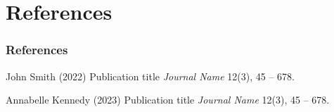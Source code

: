 \documentclass[
	11pt, %
]{beamer}
\begin{document}



\section{References}


\begin{frame} %
	\frametitle{References}
	
	\begin{thebibliography}{99} %
		\footnotesize %
		
			John Smith (2022)
			\newblock Publication title
			\newblock \emph{Journal Name} 12(3), 45 -- 678.
			
			Annabelle Kennedy (2023)
			\newblock Publication title
			\newblock \emph{Journal Name} 12(3), 45 -- 678.
	\end{thebibliography}
\end{frame}
\end{document}
